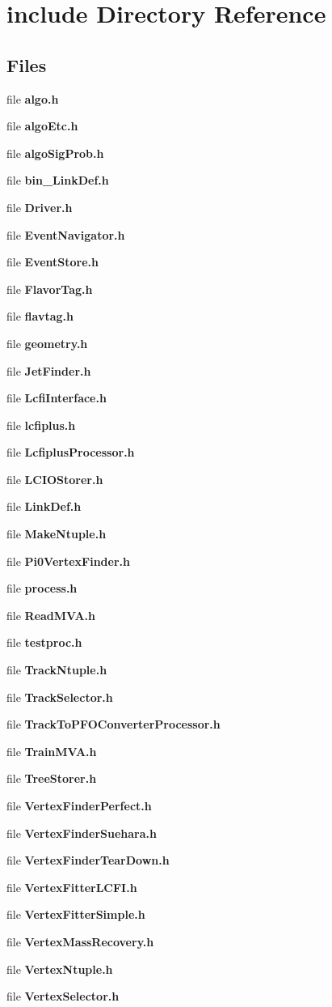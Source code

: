 \section{include Directory Reference}
\label{dir_d44c64559bbebec7f509842c48db8b23}
\subsection*{Files}
\begin{DoxyCompactItemize}
\item 
file {\bf algo.\-h}
\item 
file {\bf algo\-Etc.\-h}
\item 
file {\bf algo\-Sig\-Prob.\-h}
\item 
file {\bf bin\-\_\-\-Link\-Def.\-h}
\item 
file {\bf Driver.\-h}
\item 
file {\bf Event\-Navigator.\-h}
\item 
file {\bf Event\-Store.\-h}
\item 
file {\bf Flavor\-Tag.\-h}
\item 
file {\bf flavtag.\-h}
\item 
file {\bf geometry.\-h}
\item 
file {\bf Jet\-Finder.\-h}
\item 
file {\bf Lcfi\-Interface.\-h}
\item 
file {\bf lcfiplus.\-h}
\item 
file {\bf Lcfiplus\-Processor.\-h}
\item 
file {\bf L\-C\-I\-O\-Storer.\-h}
\item 
file {\bf Link\-Def.\-h}
\item 
file {\bf Make\-Ntuple.\-h}
\item 
file {\bf Pi0\-Vertex\-Finder.\-h}
\item 
file {\bf process.\-h}
\item 
file {\bf Read\-M\-V\-A.\-h}
\item 
file {\bf testproc.\-h}
\item 
file {\bf Track\-Ntuple.\-h}
\item 
file {\bf Track\-Selector.\-h}
\item 
file {\bf Track\-To\-P\-F\-O\-Converter\-Processor.\-h}
\item 
file {\bf Train\-M\-V\-A.\-h}
\item 
file {\bf Tree\-Storer.\-h}
\item 
file {\bf Vertex\-Finder\-Perfect.\-h}
\item 
file {\bf Vertex\-Finder\-Suehara.\-h}
\item 
file {\bf Vertex\-Finder\-Tear\-Down.\-h}
\item 
file {\bf Vertex\-Fitter\-L\-C\-F\-I.\-h}
\item 
file {\bf Vertex\-Fitter\-Simple.\-h}
\item 
file {\bf Vertex\-Mass\-Recovery.\-h}
\item 
file {\bf Vertex\-Ntuple.\-h}
\item 
file {\bf Vertex\-Selector.\-h}
\end{DoxyCompactItemize}
